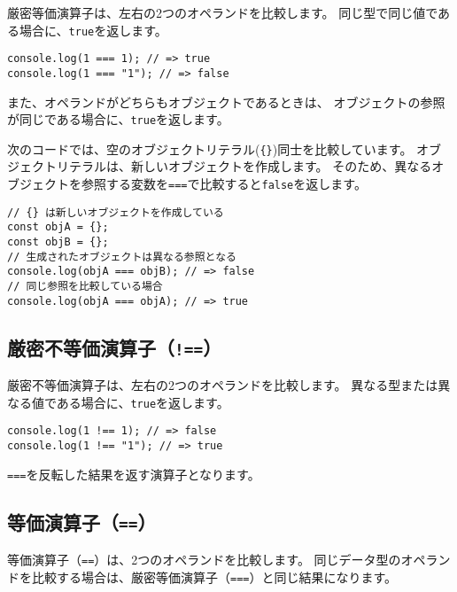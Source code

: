 厳密等価演算子は、左右の2つのオペランドを比較します。
同じ型で同じ値である場合に、\texttt{true}を返します。

\begin{lstlisting}
console.log(1 === 1); // => true
console.log(1 === "1"); // => false
\end{lstlisting}

また、オペランドがどちらもオブジェクトであるときは、
オブジェクトの参照が同じである場合に、\texttt{true}を返します。

次のコードでは、空のオブジェクトリテラル(\texttt{\{\}})同士を比較しています。
オブジェクトリテラルは、新しいオブジェクトを作成します。
そのため、異なるオブジェクトを参照する変数を\texttt{===}で比較すると\texttt{false}を返します。

\begin{lstlisting}
// {} は新しいオブジェクトを作成している
const objA = {};
const objB = {};
// 生成されたオブジェクトは異なる参照となる
console.log(objA === objB); // => false
// 同じ参照を比較している場合
console.log(objA === objA); // => true
\end{lstlisting}

\hypertarget{strict-not-equal-operator}{%
\subsection{\texorpdfstring{厳密不等価演算子（\texttt{!==}）}{厳密不等価演算子（!==）}}\label{strict-not-equal-operator}}

厳密不等価演算子は、左右の2つのオペランドを比較します。
異なる型または異なる値である場合に、\texttt{true}を返します。

\begin{lstlisting}
console.log(1 !== 1); // => false
console.log(1 !== "1"); // => true
\end{lstlisting}

\texttt{===}を反転した結果を返す演算子となります。

\hypertarget{equal-operator}{%
\subsection{\texorpdfstring{等価演算子（\texttt{==}）}{等価演算子（==）}}\label{equal-operator}}

等価演算子（\texttt{==}）は、2つのオペランドを比較します。
同じデータ型のオペランドを比較する場合は、厳密等価演算子（\texttt{===}）と同じ結果になります。


